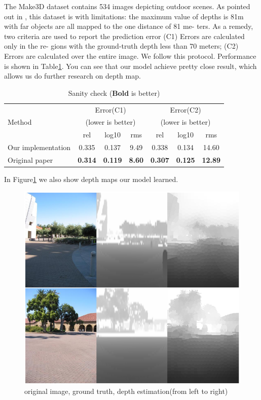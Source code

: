 \documentclass[10pt,twocolumn,letterpaper]{article}
\begin{document}
The Make3D dataset contains 534 images depicting outdoor scenes. As pointed out 
in \cite{liu2014discrete}, this dataset is with limitations: the maximum value 
of depths is 81m with far objects are all mapped to the one distance of 81 
me- ters. As a remedy, two criteria are used to report the prediction error (C1) 
Errors are calculated only in the re- gions with the ground-truth depth less 
than 70 meters; (C2) Errors are calculated over the entire image. We follow this 
protocol.
Performance is shown in Table\ref{tab:sanity}. 
You can see that
our model achieve pretty close result, which allows us do further research on depth map.
\begin{table} \center
\resizebox{\linewidth}{!} {
\begin{tabular}{ | l |  c  c  c | c  c  c |}
\hline 
\multirow{3}{*}{{{Method}}} &\multicolumn{3}{c|}{Error(C1)} 
&\multicolumn{3}{c|}{Error(C2)} \\
&\multicolumn{3}{c|}{(lower is better)} &\multicolumn{3}{c|}{(lower is better)} 
\\
\cline{2-7}
&rel &log10 &rms &rel &log10 &rms  \\
\hline
%
%
Our implementation &0.335&0.137&9.49&0.338&0.134&14.60 \\
Original paper    &\textbf{0.314}&\textbf{0.119}  &\textbf{8.60}  
&\textbf{0.307} 	 &\textbf{0.125}	 &\textbf{12.89} \\
\hline
\end{tabular}
}
\caption{Sanity check (\textbf{Bold} is better)}
\label{tab:sanity}
\end{table}

In Figure\ref{fig:depthest} we also show depth maps our model learned.
\begin{figure}
\includegraphics[width=\linewidth]{../learntd.png}
\caption{original image, ground truth, depth estimation(from left to right)}
\label{fig:depthest}
\end{figure}
\end{document}
